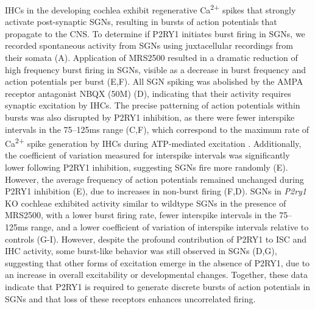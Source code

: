 \documentclass[9pt,lineno]{elife}
\begin{document}
IHCs in the developing cochlea exhibit regenerative Ca\textsuperscript{2+} spikes that strongly activate post-synaptic SGNs, resulting in bursts of action potentials that propagate to the CNS. To determine if P2RY1 initiates burst firing in SGNs, we recorded spontaneous activity from SGNs using juxtacellular recordings from their somata (A). Application of MRS2500 resulted in a dramatic reduction of high frequency burst firing in SGNs, visible as a decrease in burst frequency and action potentials per burst (E,F). All SGN spiking was abolished by the AMPA receptor antagonist NBQX (50\textmu M) (D), indicating that their activity requires synaptic excitation by IHCs. The precise patterning of action potentials within bursts was also disrupted by P2RY1 inhibition, as there were fewer interspike intervals in the 75--125ms range (C,F), which correspond to the maximum rate of Ca\textsuperscript{2+} spike generation by IHCs during ATP-mediated excitation \citep{Tritsch2010a}. Additionally, the coefficient of variation measured for interspike intervals was significantly lower following P2RY1 inhibition, suggesting SGNs fire more randomly (E). However, the average frequency of action potentials remained unchanged during P2RY1 inhibition (E), due to increases in non-burst firing (F,D). SGNs in \textit{P2ry1} KO cochleae exhibited activity similar to wildtype SGNs in the presence of MRS2500, with a lower burst firing rate, fewer interspike intervals in the 75--125ms  range,  and a lower coefficient of variation of interspike intervals relative to controls  (G-I). However, despite the profound contribution of P2RY1 to ISC and IHC activity, some burst-like behavior was still observed in SGNs (D,G), suggesting that other forms of excitation emerge in the absence of P2RY1, due to an increase in overall excitability or developmental changes. Together, these data indicate that P2RY1 is required to generate discrete bursts of action potentials in SGNs and that loss of these receptors enhances uncorrelated firing.
\end{document}
